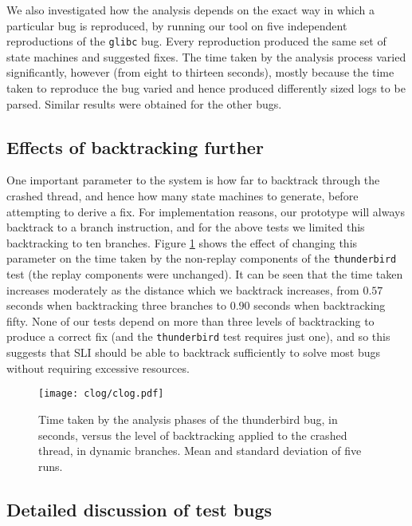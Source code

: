 \documentclass[10pt,twocolumn,preprint,natbib,authoryear]{sigplanconf}
\newcommand{\editorial}[1]{}
\begin{document}
We also investigated how the analysis depends on the exact way in 
which a particular bug is reproduced, by running our tool
on five independent reproductions of the \verb|glibc| bug.  Every
reproduction produced the same set of state machines and suggested
fixes.  The time taken by the analysis process varied significantly,
however (from eight to thirteen seconds), mostly because the time
taken to reproduce the bug varied and hence produced differently sized
logs to be parsed. Similar results were obtained for the other
bugs.\editorial{Not sure this is all that interesting, or that I've
  phrased it very well...}

\subsection{Effects of backtracking further}
\label{sect:eval:backtrack}

One important parameter to the system is how far to backtrack through
the crashed thread, and hence how many state machines to generate,
before attempting to derive a fix.  For implementation reasons, our
prototype will always backtrack to a branch instruction, and for the
above tests we limited this backtracking to ten branches.  Figure
\ref{fig:eval:backtrack} shows the effect of changing this parameter
on the time taken by the non-replay components of the
\verb|thunderbird| test (the replay components were unchanged).  It
can be seen that the time taken increases moderately as the distance
which we backtrack increases, from $0.57$ seconds when backtracking
three branches to $0.90$ seconds when backtracking fifty.  None of our
tests depend on more than three levels of backtracking to produce a
correct fix (and the \verb|thunderbird| test requires just one), and
so this suggests that SLI should be able to backtrack sufficiently to
solve most bugs without requiring excessive resources.\editorial{Meh.}

\begin{figure}
\texttt{[image: clog/clog.pdf]}
\caption{Time taken by the analysis phases of the thunderbird bug, in
  seconds, versus the level of backtracking applied to the crashed
  thread, in dynamic branches.  Mean and standard deviation of five
  runs.}
\label{fig:eval:backtrack}
\end{figure}


\subsection{Detailed discussion of test bugs}
\label{sect:bug_descr}
\end{document}
